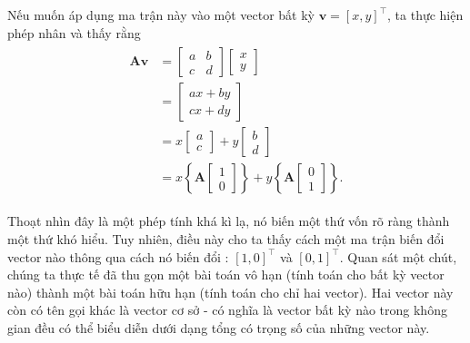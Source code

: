\documentclass[letterpaper,11pt,english]{sphinxmanual}
\begin{document}
Nếu muốn áp dụng ma trận này vào một vector bất kỳ
\(\mathbf{v} = [x, y]^\top\), ta thực hiện phép nhân và thấy rằng
\begin{equation}\label{equation:chapter_appendix_math/geometry-linear-algebric-ops_vn:chapter_appendix_math/geometry-linear-algebric-ops_vn:9}
\begin{split}\begin{aligned}
\mathbf{A}\mathbf{v} & = \begin{bmatrix}a & b \\ c & d\end{bmatrix}\begin{bmatrix}x \\ y\end{bmatrix} \\
& = \begin{bmatrix}ax+by\\ cx+dy\end{bmatrix} \\
& = x\begin{bmatrix}a \\ c\end{bmatrix} + y\begin{bmatrix}b \\d\end{bmatrix} \\
& = x\left\{\mathbf{A}\begin{bmatrix}1\\0\end{bmatrix}\right\} + y\left\{\mathbf{A}\begin{bmatrix}0\\1\end{bmatrix}\right\}.
\end{aligned}\end{split}
\end{equation}


Thoạt nhìn đây là một phép tính khá kì lạ, nó biến một thứ vốn rõ ràng
thành một thứ khó hiểu. Tuy nhiên, điều này cho ta thấy cách một ma trận
biến đổi  vector nào thông qua cách nó biến đổi : \([1,0]^\top\) và \([0,1]^\top\). Quan sát một chút, chúng
ta thực tế đã thu gọn một bài toán vô hạn (tính toán cho bất kỳ vector
nào) thành một bài toán hữu hạn (tính toán cho chỉ hai vector). Hai
vector này còn có tên gọi khác là vector cơ sở - có nghĩa là vector bất
kỳ nào trong không gian đều có thể biểu diễn dưới dạng tổng có trọng số
của những vector này.
\end{document}
